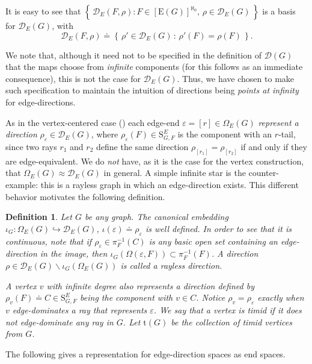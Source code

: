 \documentclass[10pt]{article}
\numberwithin{equation}{subsection}
\newtheorem{definition}[equation]{Definition}
\theoremstyle{remark}
\newcommand{\st}{\, : \,}
\newcommand{\set}[1]{\left\{\, {#1} \,\right\}}
\begin{document}
It is easy to see that $\set{\mathcal{D}_E(F,\rho):F\in [\mathrm{E}(G)]^{\aleph_0}, \, \rho\in \mathcal{D}_E(G)}$ is a basis for $\mathcal{D}_E(G)$, with
\[\mathcal{D}_E(F,\rho) \doteq \set{\rho'\in \mathcal{D}_E(G)\st \rho'(F) = \rho(F)}.\]

We note that, although it need not to be specified in the definition of $\mathcal{D}(G)$ that the maps choose from \emph{infinite} components (for this follows as an immediate consequence), this is not the case for $\mathcal{D}_E(G)$. Thus, we have chosen to make such specification to maintain the intuition of directions being \emph{points at infinity} for edge-directions.


As in the vertex-centered case (\cite{DIESTEL2003197}) each edge-end $\varepsilon = [r] \in \Omega_E(G)$ \emph{represent a direction} $ \rho_\varepsilon \in \mathcal{D}_E(G)$, where $\rho_\varepsilon(F) \in  \mathrm{S}^E_{G,F}$ is the component with an $r$-tail, since two rays $r_1$ and $r_2$ define the same direction $\rho_{[r_1]} = \rho_{[r_2]}$ if and only if they are edge-equivalent. We do \emph{not} have, as it is the case for the vertex construction, that $\Omega_E(G) \approx \mathcal{D}_E(G)$ in general. A simple infinite star is the counter-example: this is a rayless graph in which an edge-direction exists. This different behavior motivates the following definition.

\begin{definition}\label{DEF_CanonicalEmbed}
    Let $G$ be any graph. The \emph{canonical embedding} $\iota_G:\Omega_E(G)\hookrightarrow \mathcal{D}_E(G)$, $\iota(\varepsilon) \doteq \rho_\varepsilon$ is well defined. In order to see that it is continuous, note that if $\rho_\varepsilon \in \pi_F^{-1}(C)$ is any basic open set containing an edge-direction in the image, then $\iota_G(\Omega(\varepsilon,F)) \subset \pi_F^{-1}(F)$. A direction $\rho \in \mathcal{D}_E(G)\backslash \iota_G(\Omega_E(G))$ is called a \emph{rayless direction}. 
    
    A vertex $v$ with infinite degree also \emph{represents a direction} defined by $\rho_v(F) \doteq C \in \mathrm{S}^E_{G,F}$ being the component with $v \in C$. Notice $\rho_v = \rho_\varepsilon$ exactly when $v$ \emph{edge-dominates} a ray that represents $\varepsilon$. We say that a vertex is \emph{timid} if it does not edge-dominate any ray in $G$. Let $\mathrm{t}(G)$ be the collection of timid vertices from $G$. 
\end{definition}

The following gives a representation for edge-direction spaces as end spaces. 
\end{document}
